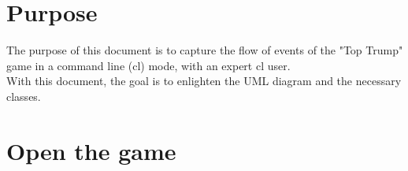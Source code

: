 \documentclass[a4paper, 12pt]{article}
\begin{document}
\section*{Purpose}
The purpose of this document is to capture the flow of events of the "Top Trump" game in a command line (cl) mode, with an expert cl user.\\
With this document, the goal is to enlighten the UML diagram and the necessary classes.

\section{Open the game}
\end{document}
